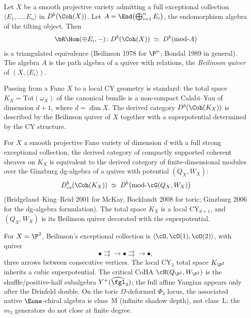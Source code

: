 \begin{theorem}
\label{thm:beilinson-bondal}
Let $X$ be a smooth projective variety admitting a full exceptional collection $\langle E_1, \ldots, E_n \rangle$ in $D^b(\Coh(X))$. Let $A = \End\bigl(\bigoplus_{i=1}^n E_i\bigr)$, the endomorphism algebra of the tilting object. Then
\[
 \bR\Hom(\oplus E_i, -) \colon D^b(\Coh(X)) \;\simeq\; D^b(\mathrm{mod}\text{-}A)
\]
is a triangulated equivalence (Beilinson 1978 for $\P^n$; Bondal 1989 in general). The algebra $A$ is the path algebra of a quiver with relations, the \emph{Beilinson quiver} of $(X, \langle E_i \rangle)$.
\end{theorem}

Passing from a Fano $X$ to a local CY geometry is standard: the total space $K_X = \mathrm{Tot}(\omega_X)$ of the canonical bundle is a non-compact Calabi--Yau of dimension $d + 1$, where $d = \dim X$. The derived category $D^b(\Coh(K_X))$ is described by the Beilinson quiver of $X$ together with a superpotential determined by the CY structure.

\begin{proposition}
\label{prop:local-cy-quiver}
For $X$ a smooth projective Fano variety of dimension $d$ with a full strong exceptional collection, the derived category of compactly supported coherent sheaves on $K_X$ is equivalent to the derived category of finite-dimensional modules over the Ginzburg dg-algebra of a quiver with potential $(Q_X, W_X)$:
\[
 D^b_{cs}(\Coh(K_X)) \;\simeq\; D^b\bigl(\mathrm{mod}\text{-}\cG(Q_X, W_X)\bigr)
\]
(Bridgeland--King--Reid 2001 for McKay, Bocklandt 2008 for toric; Ginzburg 2006 for the dg-algebra formulation). The total space $K_X$ is a local CY$_{d+1}$, and $(Q_X, W_X)$ is its Beilinson quiver decorated with the superpotential.
\end{proposition}

\begin{example}
\label{ex:local-p2}
For $X = \P^2$, Beilinson's exceptional collection is $\langle \cO, \cO(1), \cO(2) \rangle$, with quiver
\[
 \bullet \rightrightarrows\!\!\rightarrow \bullet \rightrightarrows\!\!\rightarrow \bullet,
\]
three arrows between consecutive vertices. The local CY$_3$ total space $K_{\P^2}$ inherits a cubic superpotential. The critical CoHA $\cH(Q_{\P^2}, W_{\P^2})$ is the shuffle/positive-half subalgebra $Y^{+}(\widehat{\fgl}_3)$; the full affine Yangian appears only after the Drinfeld double. On the toric $\Omega$-deformed $\Phi_3$ locus, the associated native $\Eone$-chiral algebra is class~M (infinite shadow depth), not class~L: the $m_3$ generators do not close at finite degree.
\end{example}

